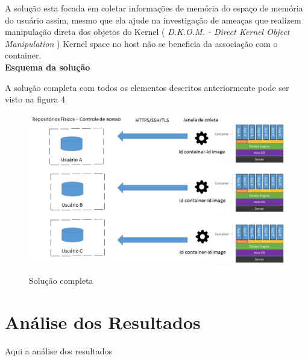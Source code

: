 \documentclass[
	12pt,				%
	openright,			%
	oneside,			%
	a4paper,			%
	english,			%
	brazil,				%
	]{abntex2}
\begin{document}
A solução esta focada em coletar informações de memória do espaço de memória do usuário assim, mesmo que ela ajude na investigação de ameaças que realizem manipulação direta
dos objetos do Kernel ( \textit{D.K.O.M. - Direct Kernel Object Manipulation} ) Kernel space no host não se beneficia da associação com o container.\\

\textbf{Esquema da solução}

A solução completa com todos os elementos descritos anteriormente pode ser visto na figura 4

\begin{figure}[h]
\caption{Solução completa}
\includegraphics[scale=0.5]{solucao.jpg}
\centering
\label{fig:Solucao}
\end{figure}

\chapter{Análise dos Resultados}

Aqui a análise dos resultados \cite{Quick2014}


\postextual





\printindex
\end{document}
